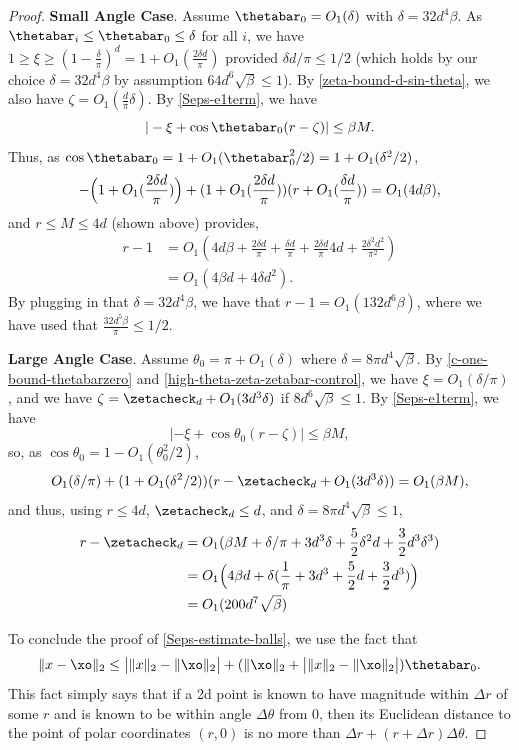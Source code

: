 \begin{proof}
\textbf{Small Angle Case}.  Assume $\thetabar_0 = O_1(\delta)$ with $\delta = 32 d^4 \beta$.  As $\thetabar_i \leq \thetabar_0 \leq \delta$ for all $i$, we have $1 \geq \xi \geq (1 - \frac{\delta}{\pi})^d = 1 + O_1(\frac{2 \delta d}{\pi})$ provided $\delta d/\pi \leq 1/2$ (which holds by our choice $\delta = 32 d^4 \beta$ by assumption $64 d^6 \sqrt{\beta} \leq 1$).   By \eqref{zeta-bound-d-sin-theta}, we also have $\zeta = O_1( \frac{d}{\pi} \delta)$.  By \eqref{Seps-e1term},  we have
\[
|-\xi + \cos \thetabar_0 ( r - \zeta)| \leq \beta M.
\]
Thus, as $\cos \thetabar_0 = 1 + O_1(\thetabar_0^2/2) = 1 + O_1(\delta^2/2)$,
\[
-\Bigl( 1 + O_1(\frac{2 \delta d}{\pi}) \Bigr) + (1 + O_1(\frac{2 \delta d}{\pi}) )(r + O_1(\frac{\delta d}{\pi})) = O_1(4 d \beta),
\]
and $r \leq M\leq 4 d$ (shown above) provides,
\begin{align}
r-1 &= O_1(4d \beta + \frac{2 \delta d}{\pi} + \frac{\delta d}{\pi} + \frac{2 \delta d}{\pi}4d + \frac{2 \delta^2 d^2}{\pi^2} )\\
&= O_1(4 \beta d + 4 \delta d^2).
\end{align}
By plugging in that $\delta = 32 d^4 \beta$, we have that $r-1 = O_1(132 d^6 \beta)$, where we have used that $\frac{32 d^5 \beta}{\pi} \leq 1/2$.

\textbf{Large Angle Case}.  Assume $\theta_0 = \pi + O_1(\delta)$ where $\delta = 8 \pi d^4 \sqrt{\beta}$.  By \eqref{c-one-bound-thetabarzero} and \eqref{high-theta-zeta-zetabar-control}, we have $\xi = O_1(\delta/\pi)$, and we have $\zeta = \zetacheck_d + O_1(3 d^3 \delta)$ if $8 d^6 \sqrt{\beta} \leq 1$.
By \eqref{Seps-e1term}, we have 
\[
|-\xi +  \cos \theta_0 (r - \zeta) | \leq \beta M,
\]
so, as $\cos \theta_0 = 1 - O_1(\theta_0^2/2)$,
\[
O_1(\delta/\pi) + (1 + O_1(\delta^2/2))(r - \zetacheck_d + O_1(3 d^3 \delta)) = O_1(\beta M),
\]
and thus, using $r \leq 4 d$, $\zetacheck_d \leq d$, and $\delta = 8 \pi d^4 \sqrt{\beta} \leq 1$,
\begin{align}
r - \zetacheck_d &= O_1(\beta M + \delta/\pi + 3 d^3 \delta + \frac{5}{2} \delta^2 d + \frac{3}{2} d^3 \delta^3) \\
&= O_1 \Bigl(4 \beta d + \delta ( \frac{1}{\pi} + 3 d^3 + \frac{5}{2} d + \frac{3}{2} d^3) \Bigr) \\
&= O_1(200 d^7 \sqrt{\beta})
\end{align}

To conclude the proof of \eqref{Seps-estimate-balls}, we use the fact that
\[
\|x - \xo\|_2 \leq  \bigl| \|x\|_2 - \|\xo\|_2   \bigr| + ( \|\xo\|_2 +  \bigl| \|x\|_2 - \|\xo\|_2   \bigr| ) \thetabar_0.
\]
This fact simply says that if a 2d point is known to have magnitude within $\Delta r$ of some $r$ and is known to be within angle $\Delta \theta$ from $0$, then its Euclidean distance to the point of polar coordinates $(r,0)$ is no more than $\Delta r + (r +  \Delta r) \Delta \theta$.



\end{proof}
